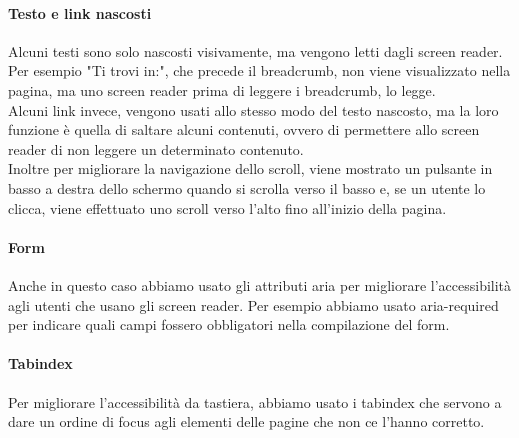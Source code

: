 \paragraph{Testo e link nascosti} Alcuni testi sono solo nascosti visivamente, ma vengono letti dagli screen reader. Per esempio "Ti trovi in:", che precede il breadcrumb, non viene visualizzato nella pagina, ma uno screen reader prima di leggere i breadcrumb, lo legge.\\
Alcuni link invece, vengono usati allo stesso modo del testo nascosto, ma la loro funzione è quella di saltare alcuni contenuti, ovvero di permettere allo screen reader di non leggere un determinato contenuto.\\
Inoltre per migliorare la navigazione dello scroll, viene mostrato un pulsante in basso a destra dello schermo quando si scrolla verso il basso e, se un utente lo clicca, viene effettuato uno scroll verso l'alto fino all'inizio della pagina.

\paragraph{Form} Anche in questo caso abbiamo usato gli attributi aria per migliorare l'accessibilità agli utenti che usano gli screen reader. Per esempio abbiamo usato aria-required per indicare quali campi fossero obbligatori nella compilazione del form.

\paragraph{Tabindex} Per migliorare l'accessibilità da tastiera, abbiamo usato i tabindex che servono a dare un ordine di focus agli elementi delle pagine che non ce l'hanno corretto.